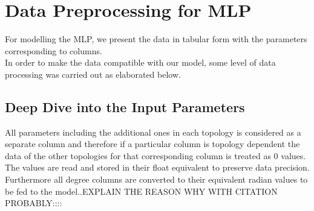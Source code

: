\documentclass{report} %
\begin{document}
\section{Data Preprocessing for \ac{MLP}}\label{sec:Data Preprocessing for MLP}

For modelling the \ac{MLP}, we present the data in tabular form with the parameters corresponding to columns. \\
In order to make the data compatible with our model, some level of data processing was carried out as elaborated below.

\subsection{Deep Dive into the Input Parameters}\label{sec:Deep Dive into Input Parameters}
All parameters including the additional ones in each topology is considered as a separate column and therefore if a particular column is topology dependent the data of the other topologies for that corresponding column is treated as 0 values.\\
The values are read and stored in their float equivalent to preserve data precision. Furthermore all degree columns are converted to their equivalent radian values to be fed to the model..EXPLAIN THE REASON WHY WITH CITATION PROBABLY::::\\
\end{document}
